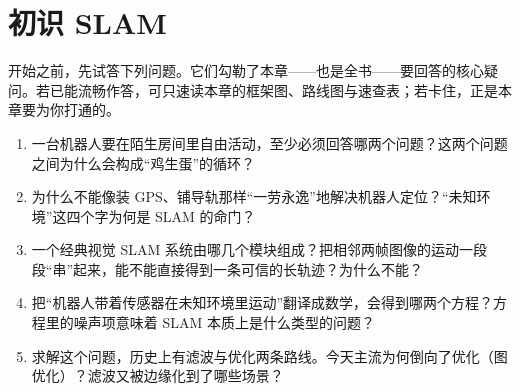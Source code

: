 \chapter{初识 SLAM}
\label{ch:intro}


\begin{practice}[前置自测]
开始之前，先试答下列问题。它们勾勒了本章——也是全书——要回答的核心疑问。若已能流畅作答，可只速读本章的框架图、路线图与速查表；若卡住，正是本章要为你打通的。
\begin{enumerate}
  \item 一台机器人要在陌生房间里自由活动，至少必须回答哪两个问题？这两个问题之间为什么会构成“鸡生蛋”的循环？
  \item 为什么不能像装 GPS、铺导轨那样“一劳永逸”地解决机器人定位？“未知环境”这四个字为何是 SLAM 的命门？
  \item 一个经典视觉 SLAM 系统由哪几个模块组成？把相邻两帧图像的运动一段段“串”起来，能不能直接得到一条可信的长轨迹？为什么不能？
  \item 把“机器人带着传感器在未知环境里运动”翻译成数学，会得到哪两个方程？方程里的噪声项意味着 SLAM 本质上是什么类型的问题？
  \item 求解这个问题，历史上有滤波与优化两条路线。今天主流为何倒向了优化（图优化）？滤波又被边缘化到了哪些场景？
\end{enumerate}
\end{practice}

